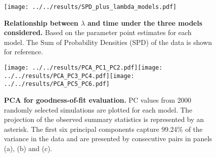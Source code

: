 \documentclass[a4paper]{article}
\begin{document}




\begin{figure}[h]
\begin{center}
\texttt{[image: ../../results/SPD\_plus\_lambda\_models.pdf]}
\end{center}
\caption{\textbf{Relationship between $\lambda$ and time under the three models considered.} Based on the parameter point estimates for each model. The Sum of Probability Densities (SPD) of the data is shown for reference.}
\label{fig:skylines}
\end{figure}


\begin{figure}[h]
\begin{center}
\texttt{[image: ../../results/PCA\_PC1\_PC2.pdf]}\texttt{[image: ../../results/PCA\_PC3\_PC4.pdf]}\texttt{[image: ../../results/PCA\_PC5\_PC6.pdf]}
\end{center}
\caption{\textbf{PCA for goodness-of-fit evaluation.} PC values from 2000 randomly selected simulations are plotted for each model. The projection of the observed summary statistics is represented by an asterisk. The first six principal components capture 99.24\% of the variance in the data and are presented by consecutive pairs in panels (a), (b) and (c).}
\label{fig:PCA_all}
\end{figure}
\end{document}
